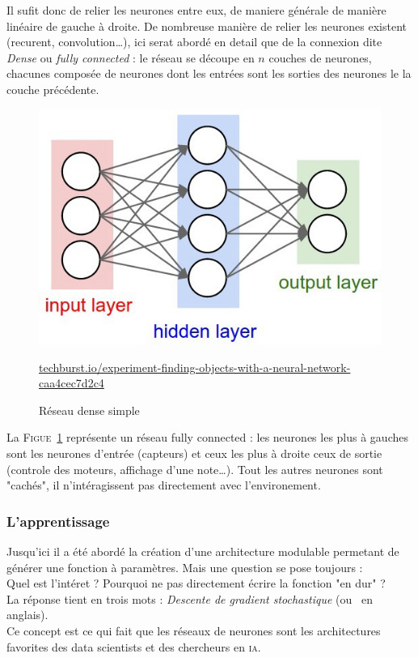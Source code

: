 Il sufit donc de relier les neurones entre eux, de maniere générale de manière linéaire de gauche à droite.
De nombreuse manière de relier les neurones existent (recurent, convolution\ldots),
ici serat abordé en detail que de la connexion dite \emph{Dense} ou \emph{fully connected} :
le réseau se découpe en $n$ couches de neurones,
chacunes composée de neurones dont les entrées sont les sorties des neurones le la couche précédente.
\begin{figure}[H]
    \center
    \includegraphics[height=\petit]{pict/net1.jpeg}
	\caption{Réseau dense simple}
    {\tiny \url{techburst.io/experiment-finding-objects-with-a-neural-network-caa4cec7d2c4}}
	\label{fig:simple-dense}
\end{figure}
La \textsc{Figue}\ \ref{fig:simple-dense} représente un réseau fully connected :
les neurones les plus à gauches sont les neurones d'entrée (capteurs)
et ceux les plus à droite ceux de sortie (controle des moteurs, affichage d'une note\ldots).
Tout les autres neurones sont "cachés", il n'intéragissent pas directement avec l'environement.


\subsubsection{L'apprentissage}
Jusqu'ici il a été abordé la création d'une architecture modulable permetant de générer une fonction à paramètres.
Mais une question se pose toujours :\\
Quel est l'intéret ?
Pourquoi ne pas directement écrire la fonction "en dur" ?\\
La réponse tient en trois mots : \textit{Descente de gradient stochastique} (ou  \sgd\ en anglais). \\
Ce concept est ce qui fait que les réseaux de neurones sont les architectures favorites
des data scientists et des chercheurs en \textsc{ia}.\\


